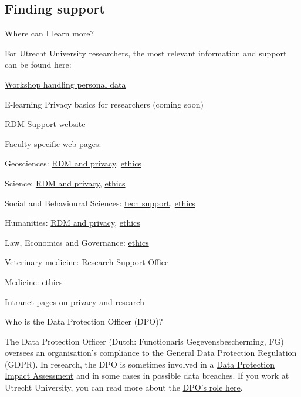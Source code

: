 \documentclass[
]{book}
\begin{document}
\hypertarget{finding-support}{%
\subsection{Finding support}\label{finding-support}}

Where can I learn more?

For Utrecht University researchers, the most relevant information and support can be found here:

\href{https://www.uu.nl/en/research/research-data-management/training-workshops/handling-personal-data-in-research}{Workshop handling personal data}

E-learning Privacy basics for researchers (coming soon)

\href{https://www.uu.nl/rdm}{RDM Support website}

Faculty-specific web pages:

Geosciences: \href{https://geo-data-support.sites.uu.nl/}{RDM and privacy}, \href{https://sciencegeo-erb.sites.uu.nl/}{ethics}

Science: \href{https://science-data-support.sites.uu.nl/}{RDM and privacy}, \href{https://sciencegeo-erb.sites.uu.nl/}{ethics}

Social and Behavioural Sciences: \href{https://techsupport.fss.uu.nl/}{tech support}, \href{https://ferb.sites.uu.nl/}{ethics}

Humanities: \href{https://cdh.uu.nl/research/data-management-privacy/}{RDM and privacy}, \href{https://fetc-gw.wp.hum.uu.nl/}{ethics}

Law, Economics and Governance: \href{https://intranet.uu.nl/en/knowledgebase/facultys-ethical-review-committee}{ethics}

Veterinary medicine: \href{https://www.uu.nl/en/node/589/onderzoeksbureauresearch-support-office}{Research Support Office}

Medicine: \href{https://www.metc-utrecht.nl/en/}{ethics}

Intranet pages on \href{https://intranet.uu.nl/en/knowledge-base/privacy-at-uu}{privacy} and \href{https://intranet.uu.nl/en/knowledgebase/research}{research}

Who is the Data Protection Officer (DPO)?

The Data Protection Officer (Dutch: Functionaris Gegevensbescherming, FG) oversees an organisation's compliance to the General Data Protection Regulation (GDPR). In research, the DPO is sometimes involved in a \protect\hyperlink{dpia}{Data Protection Impact Assessment} and in some cases in possible data breaches. If you work at Utrecht University, you can read more about the \href{https://intranet.uu.nl/en/knowledgebase/data-protection-officer}{DPO's role here}.
\end{document}
